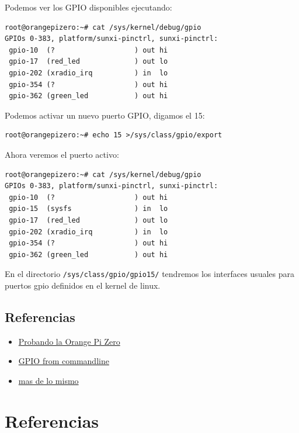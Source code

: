 \documentclass[12pt,spanish,]{scrartcl}
\providecommand{\tightlist}{%
  \setlength{\itemsep}{0pt}\setlength{\parskip}{0pt}}
\begin{document}
Podemos ver los GPIO disponibles ejecutando:

\begin{verbatim}
root@orangepizero:~# cat /sys/kernel/debug/gpio
GPIOs 0-383, platform/sunxi-pinctrl, sunxi-pinctrl:
 gpio-10  (?                   ) out hi
 gpio-17  (red_led             ) out lo
 gpio-202 (xradio_irq          ) in  lo
 gpio-354 (?                   ) out hi
 gpio-362 (green_led           ) out hi
\end{verbatim}

Podemos activar un nuevo puerto GPIO, digamos el 15:

\begin{verbatim}
root@orangepizero:~# echo 15 >/sys/class/gpio/export
\end{verbatim}

Ahora veremos el puerto activo:

\begin{verbatim}
root@orangepizero:~# cat /sys/kernel/debug/gpio 
GPIOs 0-383, platform/sunxi-pinctrl, sunxi-pinctrl:
 gpio-10  (?                   ) out hi
 gpio-15  (sysfs               ) in  lo
 gpio-17  (red_led             ) out lo
 gpio-202 (xradio_irq          ) in  lo
 gpio-354 (?                   ) out hi
 gpio-362 (green_led           ) out hi
\end{verbatim}

En el directorio \texttt{/sys/class/gpio/gpio15/} tendremos los
interfaces usuales para puertos gpio definidos en el kernel de linux.

\subsection{Referencias}\label{referencias}

\begin{itemize}
\tightlist
\item
  \href{http://harald.studiokubota.com/wordpress/index.php/2016/11/19/orange-pi-zero-neat/}{Probando
  la Orange Pi Zero}
\item
  \href{http://falsinsoft.blogspot.com.es/2012/11/access-gpio-from-linux-user-space.html}{GPIO
  from commandline}
\item
  \href{http://www.emcraft.com/stm32f429discovery/controlling-gpio-from-linux-user-space}{mas
  de lo mismo}
\end{itemize}

\section{Referencias}\label{referencias-1}
\end{document}
